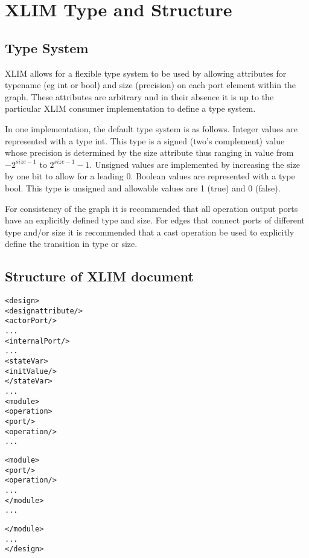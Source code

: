 

\chapter{XLIM Type and Structure}


\section{Type System}

XLIM allows for a flexible type system to be used by allowing attributes for typename (eg int or bool) and size (precision) on each port element within the graph.  These attributes are arbitrary and in their absence it is up to the particular XLIM consumer implementation to define a type system.  

In one implementation, the default type system is as follows.  Integer values are represented with a type int.  This type is a signed (two's complement) value whose precision is determined by the size attribute thus ranging in value from $-2^{size-1}$ to $2^{size-1}-1$.  Unsigned values are implemented by increasing the size by one bit to allow for a leading 0.  Boolean values are represented with a type bool.  This type is unsigned and allowable values are 1 (true) and 0 (false).

For consistency of the graph it is recommended that all operation output ports have an explicitly defined type and size.  For edges that connect ports of different type and/or size it is recommended that a cast operation be used to explicitly define the transition in type or size.  

\section{Structure of XLIM document}

\begin{alltt}
<design>
	<design attribute/>
	<actorPort/>
	...
	<internalPort/>
	...
	<stateVar>
		<initValue/>
	</stateVar>
	...
	<module>
		<operation>
			<port/>
		<operation/>
		...
				
		<module>
			<port/>
			<operation/>
			...
		</module>
		...

	</module>
	...
</design>
\end{alltt}